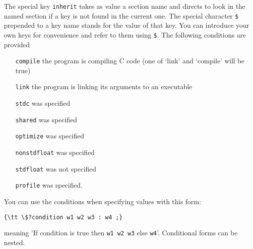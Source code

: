 The special key {\tt inherit} takes as value a section name and directs \uniclcmd{}
to look in the named section if a key is not found in the current one. The special character
{\tt \$} prepended to a key name stands for the value of that key. You can introduce your own
keys for convenience and refer to them using {\tt \$}. The following conditions are provided 
\begin{itemize}
\item  [{\tt compile}]     the program is compiling C  code (one of `link' and `compile' will be true)
\item  [{\tt link}]        the program is linking its arguments to an executable
\item  [{\tt stdc}]        was specified
\item  [{\tt shared}]       was specified
\item  [{\tt optimize}]     was specified
\item  [{\tt nonstdfloat}]  was specified
\item  [{\tt stdfloat}]     was not specified
\item  [{\tt profile}]      was specified.
\end{itemize}
You can use the conditions when specifying values with this form:
\begin{small}
\begin{verbatim}
{\tt \$?condition w1 w2 w3 : w4 ;}
\end{verbatim}
\end{small}
meaning 'If condition is true then {\tt w1 w2 w3} else {\tt w4}'. Conditional 
forms can be nested.




















